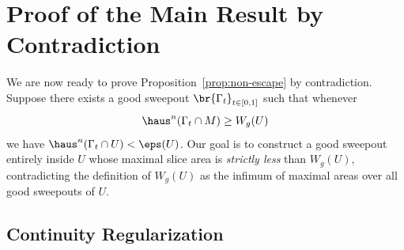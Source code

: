 \section{Proof of the Main Result by Contradiction}\label{sec:proof-by-contradiction}

We are now ready to prove Proposition~\ref{prop:non-escape} by contradiction. Suppose there exists
a good sweepout $\br{\Gamma_t}_{t \in [0, 1]}$ such that whenever
\begin{equation*}
    \haus^n(\Gamma_t\cap M) \geq W_g(U)
\end{equation*}
we have $\haus^n(\Gamma_t\cap U) < \eps(U)$. Our goal is to construct a good sweepout entirely
inside $U$ whose maximal slice area is \emph{strictly less} than $W_g(U)$, contradicting the
definition of $W_g(U)$ as the infimum of maximal areas over all good sweepouts of $U$.

\subsection{Continuity Regularization}

